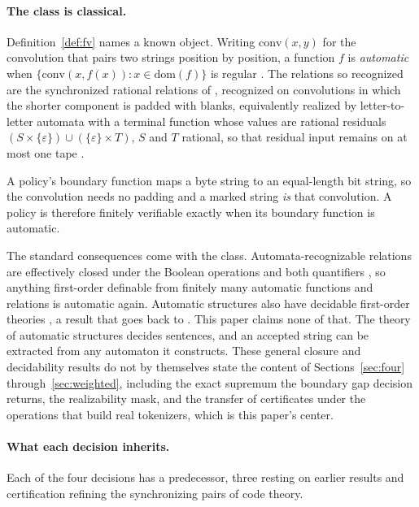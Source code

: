 \documentclass[11pt,a4paper]{article}
\theoremstyle{definition}
\theoremstyle{plain}
\begin{document}
\paragraph{The class is classical.} Definition~\ref{def:fv} names a known object. Writing $\mathrm{conv}(x,y)$ for the
convolution that pairs two strings position by position, a function $f$ is \emph{automatic} when
$\{\mathrm{conv}(x, f(x)) : x \in \mathrm{dom}(f)\}$ is regular \citep[Definitions~2.1 and~2.2]{case2013automatic}. The
relations so recognized are the synchronized rational relations of \citet{frougny1993synchronized}, recognized on
convolutions in which the shorter component is padded with blanks, equivalently realized by letter-to-letter automata
with a terminal function whose values are rational residuals
$(S \times \{\varepsilon\}) \cup (\{\varepsilon\} \times T)$, $S$ and $T$ rational, so that residual input remains on at
most one tape \citep[Definition~4.1]{frougny1993synchronized}.

A policy's boundary function maps a byte string to an equal-length bit string, so the convolution needs no padding and a
marked string \emph{is} that convolution. A policy is therefore finitely verifiable exactly when its boundary function
is automatic.

The standard consequences come with the class. Automata-recognizable relations are effectively closed under the Boolean
operations and both quantifiers \citep[Theorem~4.4]{khoussainov1995automatic}, so anything first-order definable from
finitely many automatic functions and relations is automatic again. Automatic structures also have decidable first-order
theories \citep[Corollary~4.2]{khoussainov1995automatic}, a result that goes back to \citet{hodgson1982direct}. This
paper claims none of that. The theory of automatic structures decides sentences, and an accepted string can be extracted
from any automaton it constructs. These general closure and decidability results do not by themselves state the content
of Sections~\ref{sec:four} through~\ref{sec:weighted}, including the exact supremum the boundary gap decision returns,
the realizability mask, and the transfer of certificates under the operations that build real tokenizers, which is this
paper's center.

\paragraph{What each decision inherits.} Each of the four decisions has a predecessor, three resting on earlier results
and certification refining the synchronizing pairs of code theory.
\end{document}
